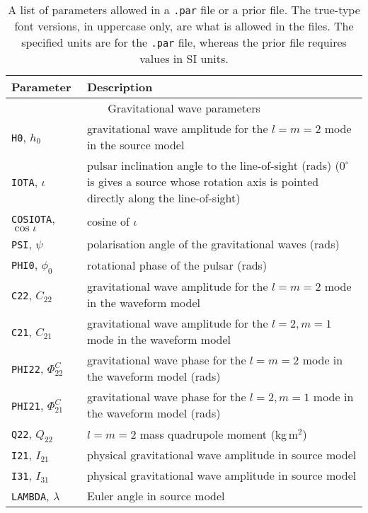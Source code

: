 \begin{longtable}{p{}|p{}}
\caption{A list of parameters allowed in a {\tt .par} file or a prior file. The true-type font versions, in uppercase only,
are what is allowed in the files. The specified units are for the {\tt .par} file, whereas the prior file
requires values in SI units.}\label{tab:paramlist} \\
Parameter & Description \\
\hline
\multicolumn{2}{c}{Gravitational wave parameters} \\
\hline
{\tt H0}, $h_0$      & gravitational wave amplitude for the $l=m=2$ mode in the source model \citep[see, e.g.,][]{1998PhRvD..58f3001J} \\
{\tt IOTA}, $\iota$  & pulsar inclination angle to the line-of-sight (rads) ($0^{\circ}$ is gives a source whose rotation axis is pointed directly along the line-of-sight) \\
{\tt COSIOTA}, $\cos{\iota}$ & cosine of $\iota$ \\
{\tt PSI}, $\psi$    & polarisation angle of the gravitational waves (rads) \citep[see, e.g.,][]{1998PhRvD..58f3001J} \\
{\tt PHI0}, $\phi_0$ & rotational phase of the pulsar (rads) \\
{\tt C22}, $C_{22}$  & gravitational wave amplitude for the $l=m=2$ mode in the waveform model \citep[see][]{2015MNRAS.453.4399P} \\
{\tt C21}, $C_{21}$  & gravitational wave amplitude for the $l=2, m=1$ mode in the waveform model \citep[see][]{2015MNRAS.453.4399P} \\
{\tt PHI22}, $\Phi_{22}^C$ & gravitational wave phase for the $l=m=2$ mode in the waveform model (rads) \citep[see][]{2015MNRAS.453.4399P} \\
{\tt PHI21}, $\Phi_{21}^C$ & gravitational wave phase for the $l=2, m=1$ mode in the waveform model (rads) \citep[see][]{2015MNRAS.453.4399P} \\
{\tt Q22}, $Q_{22}$ & $l=m=2$ mass quadrupole moment (kg\,m$^{2}$) \citep[see e.g.][]{2005PhRvL..95u1101O} \\
{\tt I21}, $I_{21}$ & physical gravitational wave amplitude in source model \citep[see][]{2015MNRAS.453.4399P} \\
{\tt I31}, $I_{31}$ & physical gravitational wave amplitude in source model \citep[see][]{2015MNRAS.453.4399P} \\
{\tt LAMBDA}, $\lambda$ & Euler angle in source model \citep[see][]{2015MNRAS.453.4399P} \\

\end{longtable}
